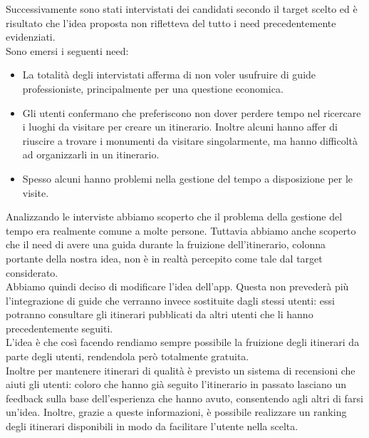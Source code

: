 Successivamente sono stati intervistati dei candidati secondo il target scelto ed è risultato che l'idea proposta non rifletteva del tutto i need precedentemente evidenziati. \\ Sono emersi i seguenti need:
\begin{itemize}
	\item La totalità degli intervistati afferma di non voler usufruire di guide professioniste, principalmente per una questione economica.
	\item Gli utenti confermano che preferiscono non dover perdere tempo nel ricercare i luoghi da visitare per creare un itinerario. Inoltre alcuni hanno affer di riuscire a trovare i monumenti da visitare singolarmente, ma hanno difficoltà ad organizzarli in un itinerario.
	\item Spesso alcuni hanno problemi nella gestione del tempo a disposizione per le visite.
\end{itemize}
Analizzando le interviste abbiamo scoperto che il problema della gestione del tempo era realmente comune a molte persone. Tuttavia abbiamo anche scoperto che il need di avere una guida durante la fruizione dell'itinerario, colonna portante della nostra idea, non
è in realtà percepito come tale dal target considerato. \\

Abbiamo quindi deciso di modificare l'idea dell'app. Questa non prevederà più l'integrazione di guide che verranno invece sostituite dagli stessi utenti: essi potranno consultare gli itinerari pubblicati da altri utenti che li hanno precedentemente seguiti. \\

L'idea è che così facendo rendiamo sempre possibile la fruizione degli itinerari da parte degli utenti, rendendola però totalmente gratuita. \\

Inoltre per mantenere itinerari di qualità è previsto un sistema di recensioni che aiuti gli utenti: coloro che hanno già seguito l'itinerario in passato lasciano un feedback sulla base dell'esperienza che hanno avuto, consentendo agli altri di farsi un'idea. Inoltre, grazie a queste informazioni, è possibile realizzare un ranking degli itinerari disponibili in modo da facilitare l'utente nella scelta.\\



